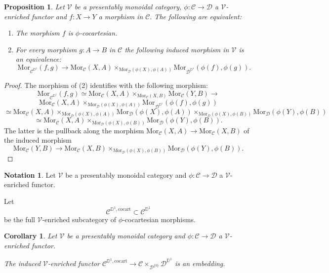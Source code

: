 \documentclass[10pt,oneside]{article}
\numberwithin{equation}{section} %
\numberwithin{figure}{section} %
\theoremstyle{plain}
\newtheorem{proposition}[theorem]{Proposition}
\newtheorem{corollary}[theorem]{Corollary}
\theoremstyle{definition}
\newtheorem{notation}[theorem]{Notation}
\newcommand{\bD}{{\mathbb D}}
\newcommand{\mC}{{\mathcal C}}
\newcommand{\mD}{{\mathcal D}}
\newcommand{\mV}{{\mathcal V}}
\newcommand{\cocart}{{\mathrm{cocart}}}
\newcommand{\Mor}{{\mathrm{Mor}}}
\begin{document}
\begin{proposition}\label{enrcharo}
Let $\mV$ be a presentably monoidal category, $\phi: \mC \to \mD$
a $\mV$-enriched functor and $f: X \to Y$ a morphism in $\mC.$
The following are equivalent:

\begin{enumerate}[\normalfont(1)]\setlength{\itemsep}{-2pt}
\item The morphism $f$ is $\phi$-cocartesian.

\item For every morphism $g: A \to B$ in $\mC$ the following induced morphism in $\mV$ is an equivalence:
$$\Mor_{\mC^{\bD^1}}(f,g) \to \Mor_\mC(X,A) \times_{\Mor_\mD(\phi(X),\phi(A))} \Mor_{\mD^{\bD^1}}(\phi(f),\phi(g)).$$ 

\end{enumerate}
    
\end{proposition}

\begin{proof}

The morphism of (2) identifies with the following morphism:
$$\Mor_{\mC^{\bD^1}}(f,g) \simeq \Mor_\mC(X,A) \times_{\Mor_\mC(X,B)} \Mor_\mC(Y, B) \to $$$$ \Mor_\mC(X,A) \times_{\Mor_\mD(\phi(X),\phi(A))} \Mor_{\mD^{\bD^1}}(\phi(f),\phi(g)) $$$$ \simeq \Mor_\mC(X,A) \times_{\Mor_\mD(\phi(X),\phi(A))} \Mor_\mD(\phi(X),\phi(A)) \times_{\Mor_\mD(\phi(X),\phi(B))} \Mor_\mD(\phi(Y),\phi(B))$$$$ \simeq \Mor_\mC(X,A) \times_{\Mor_\mD(\phi(X),\phi(B))} \Mor_\mD(\phi(Y),\phi(B)).$$
The latter is the pullback along the morphism 
$ \Mor_\mC(X,A) \to \Mor_\mC(X,B) $ of the induced morphism
$$\Mor_\mC(Y, B) \to \Mor_\mC(X,B) \times_{\Mor_\mD(\phi(X),\phi(B))} \Mor_\mD(\phi(Y),\phi(B)).$$
\end{proof}


\begin{notation}

Let $\mV$ be a presentably monoidal category and $\phi: \mC \to \mD$
a $\mV$-enriched functor.

Let $$\mC^{\bD^1, \cocart} \subset \mC^{\bD^1}$$ be the full $\mV$-enriched subcategory of $\phi$-cocartesian morphisms.
    
\end{notation}

\begin{corollary}

Let $\mV$ be a presentably monoidal category and $\phi: \mC \to \mD$
a $\mV$-enriched functor.

The induced $\mV$-enriched functor $\mC^{\bD^1, \cocart} \to \mC \times_{\mD^{\{0\}}} \mD^{\bD^1}$ is an embedding.
    
\end{corollary}
\end{document}
